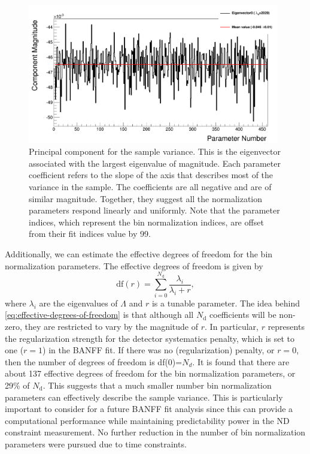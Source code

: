 \begin{figure}
\begin{centering}
\includegraphics[width=0.98\textwidth]{Chapters/Figures/P0DBANFFParameterization/EigenVector0}
\par\end{centering}
\caption[Principal Component for the Sample Variance]{Principal component for the sample variance. This is the eigenvector
associated with the largest eigenvalue of magnitude. Each parameter
coefficient refers to the slope of the axis that describes most of
the variance in the sample. The coefficients are all negative and
are of similar magnitude. Together, they suggest all the normalization
parameters respond linearly and uniformly. Note that the parameter
indices, which represent the bin normalization indices, are offset
from their fit indices value by 99.\label{fig:Principal-components}}

\end{figure}

Additionally, we can estimate the effective degrees of freedom for
the bin normalization parameters. The effective degrees of freedom
is given by
\begin{equation}
\text{df}(r)=\sum_{i=0}^{N_{\text{d}}}\frac{\lambda_{i}}{\lambda_{i}+r},\label{eq:effective-degrees-of-freedom}
\end{equation}
where $\lambda_{i}$ are the eigenvalues of $\Lambda$ and $r$ is
a tunable parameter\cite{springer_series978-0-387-84858-7}. The idea
behind \eqref{eq:effective-degrees-of-freedom} is that although all
$N_{\text{d}}$ coefficients will be non-zero, they are restricted
to vary by the magnitude of $r$. In particular, $r$ represents the
regularization strength for the detector systematics penalty, which
is set to one ($r=1$) in the BANFF fit. If there was no (regularization)
penalty, or $r=0$, then the number of degrees of freedom is df(0)=$N_{d}$.
It is found that there are about 137 effective degrees of freedom
for the bin normalization parameters, or 29\% of $N_{\text{d}}$.
This suggests that a much smaller number bin normalization parameters
can effectively describe the sample variance. This is particularly
important to consider for a future BANFF fit analysis since this can
provide a computational performance while maintaining predictability
power in the ND constraint measurement. No further reduction in the
number of bin normalization parameters were pursued due to time constraints.


